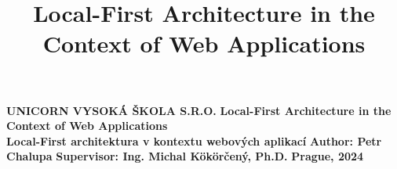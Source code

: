 \documentclass{article}
\title{Local-First Architecture in the Context of Web Applications}
\begin{document}
	\begin{titlepage}
		\begin{center}
			\textbf{UNICORN VYSOKÁ ŠKOLA S.R.O.}
			\vfill
			\textbf{\LARGE Local-First Architecture in the Context of Web Applications\\}
			\vspace{5mm}
			\textbf{Local-First architektura v kontextu webových aplikací}
			\vfill
			\textbf{Author: Petr Chalupa}
			\vfill
			\textbf{Supervisor: Ing. Michal Kökörčený, Ph.D.}
			\vfill
			\textbf{Prague, 2024}
			\vfill
		\end{center}
	\end{titlepage}
	
\end{document}
